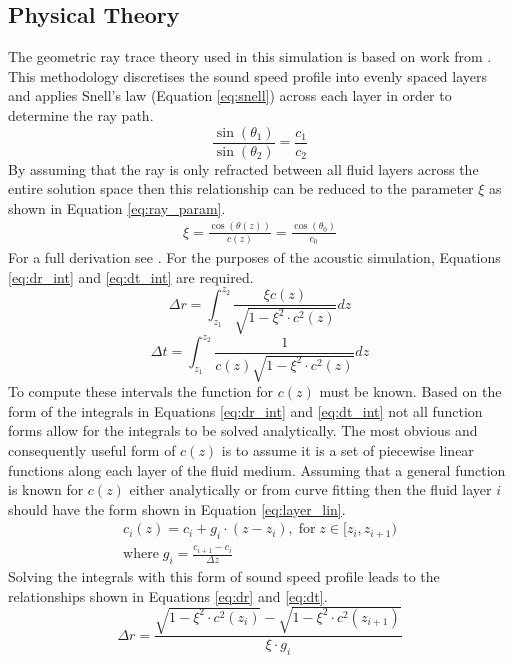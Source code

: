\documentclass{article}
\begin{document}
\subsection{Physical Theory}
The geometric ray trace theory used in this simulation is based on work from \textcite{Hovem13}. This methodology discretises the sound speed profile into evenly spaced layers and applies Snell's law (Equation \ref{eq:snell}) across each layer in order to determine the ray path.
\begin{equation}
	\label{eq:snell}
	\frac{\sin{(\theta_1)}}{\sin{(\theta_2)}}=\frac{c_1}{c_2}
\end{equation}
By assuming that the ray is only refracted between all fluid layers across the entire solution space then this relationship can be reduced to the parameter $\xi$ as shown in Equation \ref{eq:ray_param}.
\begin{align}
	\label{eq:ray_param}
	\xi = \frac{\cos{(\theta(z))}}{c(z)} = \frac{\cos{(\theta_0)}}{c_0}
\end{align}
For a full derivation see \textcite{Hovem13}. For the purposes of the acoustic simulation, Equations \ref{eq:dr_int} and \ref{eq:dt_int} are required.
\begin{equation}
	\label{eq:dr_int}
	\Delta r = \int^{z_2}_{z_1}\frac{\xi c(z)}{\sqrt{1-\xi^2\cdot c^2(z)}}dz
\end{equation}
\begin{equation}
	\label{eq:dt_int}
	\Delta t = \int^{z_2}_{z_1}\frac{1}{c(z)\sqrt{1-\xi^2\cdot c^2(z)}}dz
\end{equation}
To compute these intervals the function for $c(z)$ must be known. Based on the form of the integrals in Equations \ref{eq:dr_int} and \ref{eq:dt_int} not all function forms allow for the integrals to be solved analytically. The most obvious and consequently useful form of $c(z)$ is to assume it is a set of piecewise linear functions along each layer of the fluid medium. Assuming that a general function is known for $c(z)$ either analytically or from curve fitting then the fluid layer $i$ should have the form shown in Equation \ref{eq:layer_lin}.
\begin{equation}
	\label{eq:layer_lin}
	\begin{split}
		c_i(z) = c_i+g_i\cdot(z-z_i),\;\mathrm{for}\;z\in[z_i, z_{i+1}) \\
		\mathrm{where}\;g_i=\frac{c_{i+1}-c_{i}}{\Delta z}
	\end{split}
\end{equation}
Solving the integrals with this form of sound speed profile leads to the relationships shown in Equations \ref{eq:dr} and \ref{eq:dt}.
\begin{equation}
	\label{eq:dr}
	\Delta r = \frac{\sqrt{1-\xi^2\cdot c^2(z_i)} - \sqrt{1-\xi^2\cdot c^2(z_{i+1})}}{\xi\cdot g_i}
\end{equation}
\end{document}
